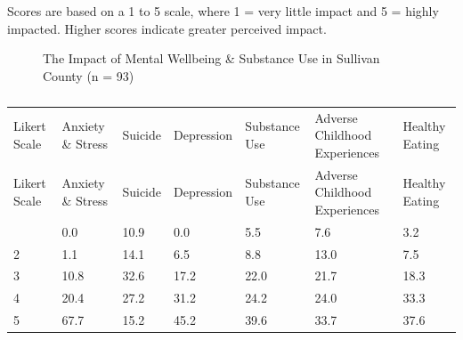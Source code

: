 \documentclass[
  english,
  letterpaper,
]{report}
\begin{document}
\begin{tcolorbox}[enhanced jigsaw, breakable, leftrule=.75mm, title=\textcolor{quarto-callout-note-color}{\faInfo}\hspace{0.5em}{Note}, bottomrule=.15mm, opacityback=0, left=2mm, colback=white, bottomtitle=1mm, coltitle=black, colbacktitle=quarto-callout-note-color!10!white, colframe=quarto-callout-note-color-frame, opacitybacktitle=0.6, toptitle=1mm, titlerule=0mm, arc=.35mm, rightrule=.15mm, toprule=.15mm]

Scores are based on a 1 to 5 scale, where 1 = very little impact and 5 =
highly impacted. Higher scores indicate greater perceived impact.

\end{tcolorbox}

\begin{figure}


\caption{\label{fig-sc-impact-mhsu}The Impact of Mental Wellbeing \&
Substance Use in Sullivan County (n = 93)}

\end{figure}%

\begin{longtable}[]{@{}lllllll@{}}

\caption{\label{tbl-sc-impact-mhsu}The Impact of Mental Wellbeing \&
Substance Use in Sullivan County (n = 93)}

\tabularnewline

\caption{}\label{T_df407}\tabularnewline
\toprule\noalign{}
Likert Scale & Anxiety \& Stress & Suicide & Depression & Substance Use
& Adverse Childhood Experiences & Healthy Eating \\
\midrule\noalign{}
\endfirsthead
\toprule\noalign{}
Likert Scale & Anxiety \& Stress & Suicide & Depression & Substance Use
& Adverse Childhood Experiences & Healthy Eating \\
\midrule\noalign{}
\endhead
\bottomrule\noalign{}
\endlastfoot
1 & 0.0 & 10.9 & 0.0 & 5.5 & 7.6 & 3.2 \\
2 & 1.1 & 14.1 & 6.5 & 8.8 & 13.0 & 7.5 \\
3 & 10.8 & 32.6 & 17.2 & 22.0 & 21.7 & 18.3 \\
4 & 20.4 & 27.2 & 31.2 & 24.2 & 24.0 & 33.3 \\
5 & 67.7 & 15.2 & 45.2 & 39.6 & 33.7 & 37.6 \\

\end{longtable}
\end{document}
